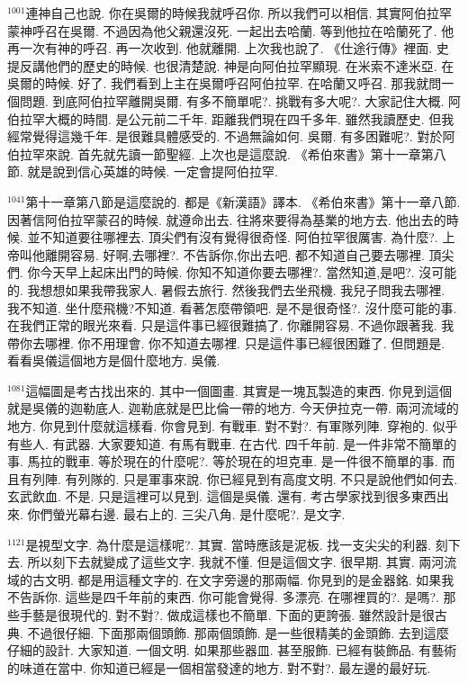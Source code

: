 \documentclass{book}
\begin{document}
$^{1001}$連神自己也說.
你在吳爾的時候我就呼召你.
所以我們可以相信.
其實阿伯拉罕蒙神呼召在吳爾.
不過因為他父親還沒死.
一起出去哈蘭.
等到他拉在哈蘭死了.
他再一次有神的呼召.
再一次收到.
他就離開.
上次我也說了.
《仕途行傳》裡面.
史提反講他們的歷史的時候.
也很清楚說.
神是向阿伯拉罕顯現.
在米索不達米亞.
在吳爾的時候.
好了.
我們看到上主在吳爾呼召阿伯拉罕.
在哈蘭又呼召.
那我就問一個問題.
到底阿伯拉罕離開吳爾.
有多不簡單呢?.
挑戰有多大呢?.
大家記住大概.
阿伯拉罕大概的時間.
是公元前二千年.
距離我們現在四千多年.
雖然我讀歷史.
但我經常覺得這幾千年.
是很難具體感受的.
不過無論如何.
吳爾.
有多困難呢?.
對於阿伯拉罕來說.
首先就先讀一節聖經.
上次也是這麼說.
《希伯來書》第十一章第八節.
就是說到信心英雄的時候.
一定會提阿伯拉罕.

$^{1041}$第十一章第八節是這麼說的.
都是《新漢語》譯本.
《希伯來書》第十一章八節.
因著信阿伯拉罕蒙召的時候.
就遵命出去.
往將來要得為基業的地方去.
他出去的時候.
並不知道要往哪裡去.
頂尖們有沒有覺得很奇怪.
阿伯拉罕很厲害.
為什麼?.
上帝叫他離開容易.
好啊,去哪裡?.
不告訴你,你出去吧.
都不知道自己要去哪裡.
頂尖們.
你今天早上起床出門的時候.
你知不知道你要去哪裡?.
當然知道,是吧?.
沒可能的.
我想想如果我帶我家人.
暑假去旅行.
然後我們去坐飛機.
我兒子問我去哪裡.
我不知道.
坐什麼飛機?不知道.
看著怎麼帶領吧.
是不是很奇怪?.
沒什麼可能的事.
在我們正常的眼光來看.
只是這件事已經很難搞了.
你離開容易.
不過你跟著我.
我帶你去哪裡.
你不用理會.
你不知道去哪裡.
只是這件事已經很困難了.
但問題是.
看看吳儀這個地方是個什麼地方.
吳儀.

$^{1081}$這幅圖是考古找出來的.
其中一個圖畫.
其實是一塊瓦製造的東西.
你見到這個就是吳儀的迦勒底人.
迦勒底就是巴比倫一帶的地方.
今天伊拉克一帶.
兩河流域的地方.
你見到什麼就這樣看.
你會見到.
有戰車.
對不對?.
有軍隊列陣.
穿袍的.
似乎有些人.
有武器.
大家要知道.
有馬有戰車.
在古代.
四千年前.
是一件非常不簡單的事.
馬拉的戰車.
等於現在的什麼呢?.
等於現在的坦克車.
是一件很不簡單的事.
而且有列陣.
有列隊的.
只是軍事來說.
你已經見到有高度文明.
不只是說他們如何去.
玄武飲血.
不是.
只是這裡可以見到.
這個是吳儀.
還有.
考古學家找到很多東西出來.
你們螢光幕右邊.
最右上的.
三尖八角.
是什麼呢?.
是文字.

$^{1121}$是視型文字.
為什麼是這樣呢?.
其實.
當時應該是泥板.
找一支尖尖的利器.
刻下去.
所以刻下去就變成了這些文字.
我就不懂.
但是這個文字.
很早期.
其實.
兩河流域的古文明.
都是用這種文字的.
在文字旁邊的那兩幅.
你見到的是金器銘.
如果我不告訴你.
這些是四千年前的東西.
你可能會覺得.
多漂亮.
在哪裡買的?.
是嗎?.
那些手藝是很現代的.
對不對?.
做成這樣也不簡單.
下面的更誇張.
雖然設計是很古典.
不過很仔細.
下面那兩個頭飾.
那兩個頭飾.
是一些很精美的金頭飾.
去到這麼仔細的設計.
大家知道.
一個文明.
如果那些器皿.
甚至服飾.
已經有裝飾品.
有藝術的味道在當中.
你知道已經是一個相當發達的地方.
對不對?.
最左邊的最好玩.
\end{document}
